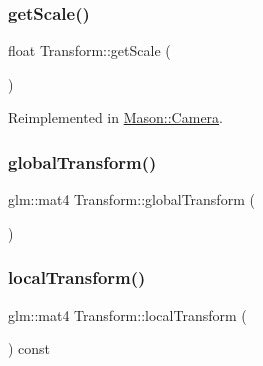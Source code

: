 \hypertarget{class_mason_1_1_transform_afb5f0dbe6bcd49e26a792f578bf5ec9d}{}\label{class_mason_1_1_transform_afb5f0dbe6bcd49e26a792f578bf5ec9d} 
\subsubsection{\texorpdfstring{get\+Scale()}{getScale()}}
{\footnotesize\ttfamily float Transform\+::get\+Scale (\begin{DoxyParamCaption}{ }\end{DoxyParamCaption})\hspace{0.3cm}{\ttfamily [virtual]}}



Reimplemented in \hyperlink{class_mason_1_1_camera_a9c86fd4a182c472001f5d52e99fc0bbc}{Mason\+::\+Camera}.

\hypertarget{class_mason_1_1_transform_a35e627aa09604bf3a81f4c07d28205f3}{}\label{class_mason_1_1_transform_a35e627aa09604bf3a81f4c07d28205f3} 
\subsubsection{\texorpdfstring{global\+Transform()}{globalTransform()}}
{\footnotesize\ttfamily glm\+::mat4 Transform\+::global\+Transform (\begin{DoxyParamCaption}{ }\end{DoxyParamCaption})}

\hypertarget{class_mason_1_1_transform_a70d142174711ef237e176e4972a194e2}{}\label{class_mason_1_1_transform_a70d142174711ef237e176e4972a194e2} 
\subsubsection{\texorpdfstring{local\+Transform()}{localTransform()}}
{\footnotesize\ttfamily glm\+::mat4 Transform\+::local\+Transform (\begin{DoxyParamCaption}{ }\end{DoxyParamCaption}) const}

\hypertarget{class_mason_1_1_transform_a6e1a6b57214a7de21595e6af8b05138b}{}\label{class_mason_1_1_transform_a6e1a6b57214a7de21595e6af8b05138b} 
